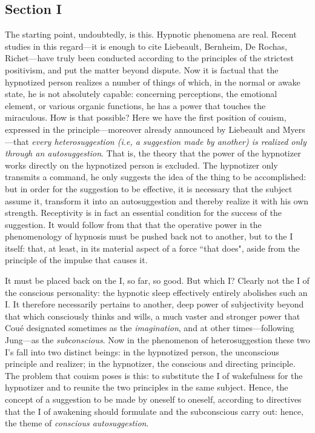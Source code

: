 \subsection*{Section I}
The starting point, undoubtedly, is this. Hypnotic phenomena are real. Recent studies in this regard—it is enough to cite Liebeault, Bernheim, De Rochas, Richet—have truly been conducted according to the principles of the strictest positivism, and put the matter beyond dispute. Now it is factual that the hypnotized person realizes a number of things of which, in the normal or awake state, he is not absolutely capable: concerning perceptions, the emotional element, or various organic functions, he has a power that touches the miraculous. How is that possible? Here we have the first position of couism, expressed in the principle—moreover already announced by Liebeault and Myers—that \textit{every heterosuggestion (i.e, a suggestion made by another) is realized only through an autosuggestion}. That is, the theory that the power of the hypnotizer works directly on the hypnotized person is excluded. The hypnotizer only transmits a command, he only suggests the idea of the thing to be accomplished: but in order for the suggestion to be effective, it is necessary that the subject assume it, transform it into an autosuggestion and thereby realize it with his own strength. Receptivity is in fact an essential condition for the success of the suggestion. It would follow from that that the operative power in the phenomenology of hypnosis must be pushed back not to another, but to the I itself: that, at least, in its material aspect of a force ``that does", aside from the principle of the impulse that causes it.

It must be placed back on the I, so far, so good. But which I? Clearly not the I of the conscious personality: the hypnotic sleep effectively entirely abolishes such an I. It therefore necessarily pertains to another, deep power of subjectivity beyond that which consciously thinks and wills, a much vaster and stronger power that Coué designated sometimes as the \textit{imagination}, and at other times—following Jung—as the \textit{subconscious}. Now in the phenomenon of heterosuggestion these two I's fall into two distinct beings: in the hypnotized person, the unconscious principle and realizer; in the hypnotizer, the conscious and directing principle. The problem that couism poses is this: to substitute the I of wakefulness for the hypnotizer and to reunite the two principles in the same subject. Hence, the concept of a suggestion to be made by oneself to oneself, according to directives that the I of awakening should formulate and the subconscious carry out: hence, the theme of \textit{conscious autosuggestion}.

